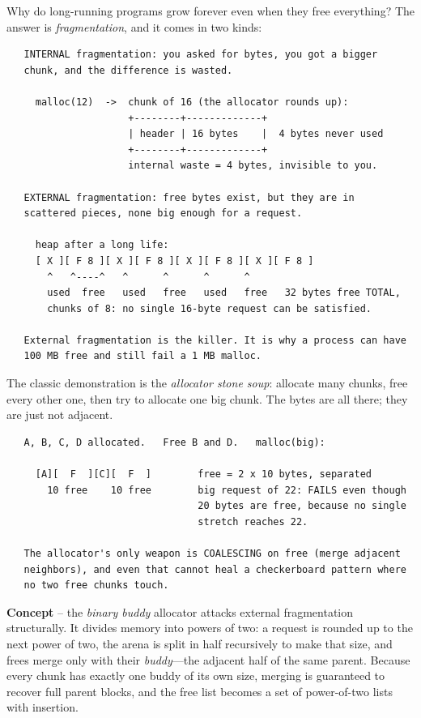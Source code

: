Why do long-running programs grow forever even when they free
everything? The answer is \emph{fragmentation}, and it comes in two
kinds:

\begin{verbatim}
   INTERNAL fragmentation: you asked for bytes, you got a bigger
   chunk, and the difference is wasted.

     malloc(12)  ->  chunk of 16 (the allocator rounds up):
                     +--------+-------------+
                     | header | 16 bytes    |  4 bytes never used
                     +--------+-------------+
                     internal waste = 4 bytes, invisible to you.

   EXTERNAL fragmentation: free bytes exist, but they are in
   scattered pieces, none big enough for a request.

     heap after a long life:
     [ X ][ F 8 ][ X ][ F 8 ][ X ][ F 8 ][ X ][ F 8 ]
       ^   ^----^   ^      ^      ^      ^
       used  free   used   free   used   free   32 bytes free TOTAL,
       chunks of 8: no single 16-byte request can be satisfied.

   External fragmentation is the killer. It is why a process can have
   100 MB free and still fail a 1 MB malloc.
\end{verbatim}

The classic demonstration is the \emph{allocator stone soup}: allocate
many chunks, free every other one, then try to allocate one big chunk.
The bytes are all there; they are just not adjacent.

\begin{verbatim}
   A, B, C, D allocated.   Free B and D.   malloc(big):

     [A][  F  ][C][  F  ]        free = 2 x 10 bytes, separated
       10 free    10 free        big request of 22: FAILS even though
                                 20 bytes are free, because no single
                                 stretch reaches 22.

   The allocator's only weapon is COALESCING on free (merge adjacent
   neighbors), and even that cannot heal a checkerboard pattern where
   no two free chunks touch.
\end{verbatim}

\textbf{Concept} -- the \emph{binary buddy} allocator attacks external
fragmentation structurally. It divides memory into powers of two:
a request is rounded up to the next power of two, the arena is split
in half recursively to make that size, and frees merge only with their
\emph{buddy}---the adjacent half of the same parent. Because every
chunk has exactly one buddy of its own size, merging is guaranteed to
recover full parent blocks, and the free list becomes a set of
power-of-two lists with  insertion.


